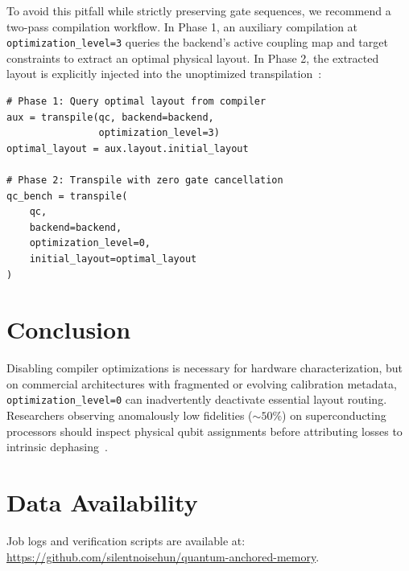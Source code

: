 \documentclass[10pt,twocolumn]{article}
\begin{document}
To avoid this pitfall while strictly preserving gate sequences, we recommend a two-pass compilation workflow. In Phase 1, an auxiliary compilation at \texttt{optimization\_level=3} queries the backend's active coupling map and target constraints to extract an optimal physical layout. In Phase 2, the extracted layout is explicitly injected into the unoptimized transpilation~\cite{sivarajah2020tket,wille2019mapping}:

\begin{verbatim}
# Phase 1: Query optimal layout from compiler
aux = transpile(qc, backend=backend, 
                optimization_level=3)
optimal_layout = aux.layout.initial_layout

# Phase 2: Transpile with zero gate cancellation
qc_bench = transpile(
    qc, 
    backend=backend, 
    optimization_level=0, 
    initial_layout=optimal_layout
)
\end{verbatim}

\section{Conclusion}

Disabling compiler optimizations is necessary for hardware characterization, but on commercial architectures with fragmented or evolving calibration metadata, \texttt{optimization\_level=0} can inadvertently deactivate essential layout routing. Researchers observing anomalously low fidelities ($\sim 50\%$) on superconducting processors should inspect physical qubit assignments before attributing losses to intrinsic dephasing~\cite{krantz_guide,blais_cqed}.

\section*{Data Availability}
Job logs and verification scripts are available at: \url{https://github.com/silentnoisehun/quantum-anchored-memory}.
\end{document}
